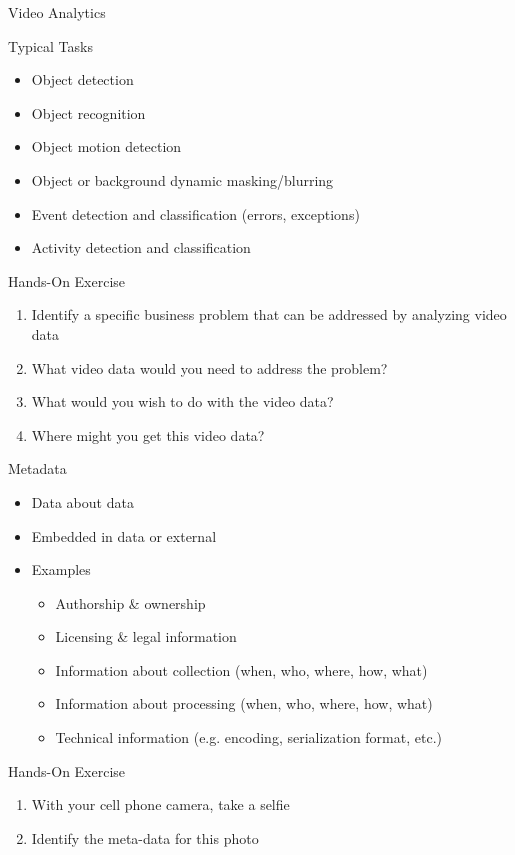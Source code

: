 \documentclass[ignorenonframetext,xcolor=x11names]{beamer}
\begin{document}
\begin{frame}{Video Analytics}
\begin{block}{Typical Tasks}
\begin{itemize}
	\item Object detection
	\item Object recognition
	\item Object motion detection
	\item Object or background dynamic masking/blurring
	\item Event detection and classification (errors, exceptions) 
	\item Activity detection and classification
\end{itemize}
\end{block}
\begin{block}{Hands-On Exercise}
\begin{enumerate}
	\item Identify a specific business problem that can be addressed by analyzing video data
	\item What video data would you need to address the problem?
	\item What would you wish to do with the video data?
	\item Where might you get this video data?
\end{enumerate}
\end{block}
\end{frame}
	
\begin{frame}{Metadata}
\begin{itemize}
	\item Data about data
	\item Embedded in data or external
	\item Examples
	\begin{itemize}
		\item Authorship \& ownership
		\item Licensing \& legal information
		\item Information about collection (when, who, where, how, what)
		\item Information about processing (when, who, where, how, what)
		\item Technical information (e.g. encoding, serialization format, etc.)
	\end{itemize}
\end{itemize}
\end{frame}

\begin{frame}{Hands-On Exercise}
\begin{enumerate}
	\item With your cell phone camera, take a selfie
	\item Identify the meta-data for this photo
\end{enumerate}
\end{frame}
\end{document}
